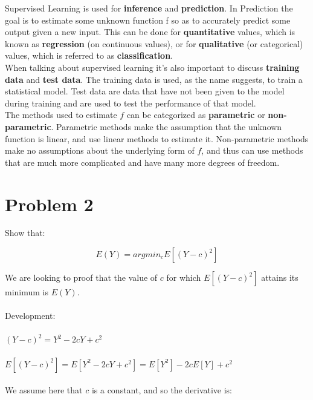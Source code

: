 \documentclass[11pt,a4paper,twoside,openright]{report}
\begin{document}
	
	\noindent Supervised Learning is used for \textbf{inference} and \textbf{prediction}. In Prediction the goal is to estimate some unknown function f so as to accurately predict some output given a new input. This can be done for \textbf{quantitative} values, which is known as \textbf{regression} (on continuous values), or for \textbf{qualitative} (or categorical) values, which is referred to as \textbf{classification}.\\
	
	
	\noindent When talking about supervised learning it's also important to discuss \textbf{training data} and \textbf{test data}. The training data is used, as the name suggests, to train a statistical model. Test data are data that have not been given to the model during training and are used to test the performance of that model.\\
	
	
	\noindent The methods used to estimate $f$ can be categorized as \textbf{parametric} or \textbf{non-parametric}. Parametric methods make the assumption that the unknown function is linear, and use linear methods to estimate it. Non-parametric methods make no assumptions about the underlying form of $f$, and thus can use methods that are much more complicated and have many more degrees of freedom.\\
	
	
	\section*{Problem 2}
	
	
	Show that:
	
	\[ E(Y) = argmin_{c}E[(Y-c)^2] \]
	
	We are looking to proof that the value of $c$ for which $E[(Y-c)^2]$ attains its minimum is $E(Y)$.\\\\
	
	
	Development:\\\\
	 
	
	$ (Y-c)^2 = Y^2 - 2cY + c^2 $\\\\
	
	
	
	$ E[(Y-c)^2] = E[Y^2 - 2cY + c^2] = E[Y^2] - 2cE[Y] + c^2	$\\\\
	
	 We assume here that $c$ is a constant, and so the derivative is: \\\\
	 
\end{document}
